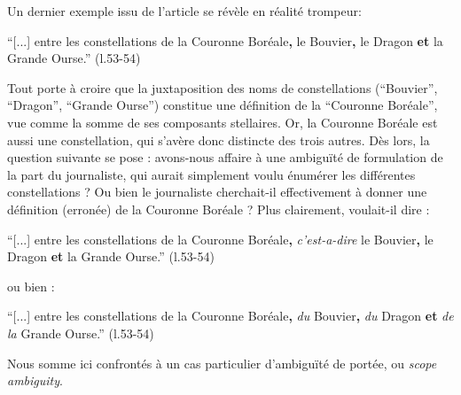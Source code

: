 \documentclass[a4paper,10pt]{article}
\begin{document}
			Un dernier exemple issu de l'article se révèle en réalité trompeur:
			\begin{center}
				\footnotesize
				\begin{minipage}{0.7\textwidth}
					``[...] entre les constellations de la Couronne Boréale\textbf{,} le Bouvier\textbf{,} le Dragon \textbf{et} la Grande Ourse.'' (l.53-54)
				\end{minipage}
			\end{center}
			Tout porte à croire que la juxtaposition des noms de constellations (``Bouvier'', ``Dragon'', ``Grande Ourse'') constitue une définition de la ``Couronne Boréale'', vue comme la somme de ses composants stellaires. Or, la Couronne Boréale est aussi une constellation, qui s'avère donc distincte des trois autres. Dès lors, la question suivante se pose : avons-nous affaire à une ambiguïté de formulation de la part du journaliste, qui aurait simplement voulu énumérer les différentes constellations ? Ou bien le journaliste cherchait-il effectivement à donner une définition (erronée) de la Couronne Boréale ? Plus clairement, voulait-il dire :
			\begin{center}
				\footnotesize
				\begin{minipage}{0.7\textwidth}
					``[...] entre les constellations de la Couronne Boréale\textbf{,} \textit{c'est-a-dire} le Bouvier\textbf{,} le Dragon \textbf{et} la Grande Ourse.'' (l.53-54)
				\end{minipage}
			\end{center}
			ou bien :
			\begin{center}
				\footnotesize
				\begin{minipage}{0.7\textwidth}
					``[...] entre les constellations de la Couronne Boréale\textbf{,} \textit{du} Bouvier\textbf{,} \textit{du} Dragon \textbf{et} \textit{de la} Grande Ourse.'' (l.53-54)
				\end{minipage}
			\end{center}
			Nous somme ici confrontés à un cas particulier d'ambiguïté de portée, ou \textit{scope ambiguity}.
\end{document}
